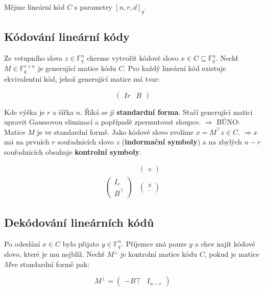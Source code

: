 Mějme lineární kód $C$ s parametry $[n,r,d]_{q}$.

\subsection{Kódování lineární kódy}

Ze vstupního slova $z \in \mathbb{F}_{q}^{n}$ chceme vytvořit kódové slovo $x \in C \subseteq \mathbb{F}_{q}^{n}$. Nechť $M \in \mathbb{F}_{q}^{r \times n}$ je generující matice kódu $C$. Pro každý lineární kód existuje ekvivalentní kód, jehož generující matice má tvar:

$$
\begin{pmatrix}
	I{r} & B
\end{pmatrix}
$$

Kde výška je $r$ a šířka $n$. Říká se jí \textbf{standardní forma}. Stačí generující matici upravit Gaussovou eliminací a popřípadě zpermutovat sloupce. $\Rightarrow$ BŮNO: Matice $M$ je ve standardní formě. Jako kódové slovo zvolíme $x = M^{\top}z \in C$. $\Rightarrow x$ má na prvních $r$ souřadnicích slovo $z$ (\textbf{indormační symboly}) a na zbylých $n-r$ souřadnicích obsahuje \textbf{kontrolní symboly}.

$$
\begin{matrix}
	&
	\begin{pmatrix}
		z
	\end{pmatrix} \\
	\begin{pmatrix}
		I_{r} \\
		B^{\top}
	\end{pmatrix}
	&
	\begin{pmatrix}
		z \\
		.
	\end{pmatrix}
\end{matrix}
$$

\subsection{Dekódování lineárních kódů}

Po odeslání $x \in C$ bylo přijato $y \in \mathbb{F}_{q}^{n}$. Příjemce zná pouze $y$ a chce najít kódové slovo, které je mu nejblíž. Nechť $M^{\bot}$ je kontrolní matice kódu $C$, pokud je matice $M$ve standardní formě pak:

$$
M^{\bot} =
\begin{pmatrix}
	-B{\top} & I_{n-r}
\end{pmatrix}
$$

